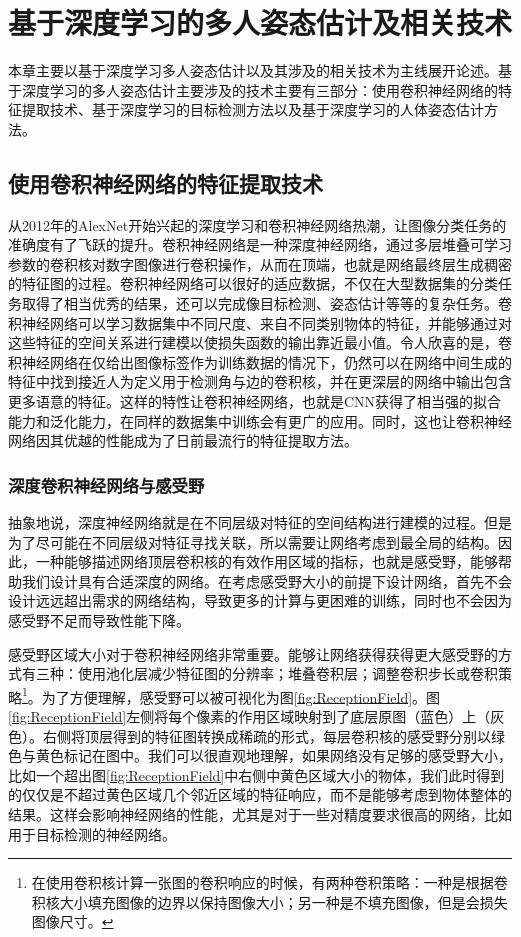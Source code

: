 \chapter{基于深度学习的多人姿态估计及相关技术}
\label{cha:basicfacts}
本章主要以基于深度学习多人姿态估计以及其涉及的相关技术为主线展开论述。基于深度学习的多人姿态估计主要涉及的技术主要有三部分：使用卷积神经网络的特征提取技术、基于深度学习的目标检测方法以及基于深度学习的人体姿态估计方法。
\section{使用卷积神经网络的特征提取技术}
\label{sec:factsfeature}
从2012年的AlexNet\cite{alex2012alexnet}开始兴起的深度学习和卷积神经网络热潮，让图像分类任务的准确度有了飞跃的提升。卷积神经网络是一种深度神经网络，通过多层堆叠可学习参数的卷积核对数字图像进行卷积操作，从而在顶端，也就是网络最终层生成稠密的特征图的过程。卷积神经网络可以很好的适应数据，不仅在大型数据集的分类任务取得了相当优秀的结果，还可以完成像目标检测、姿态估计等等的复杂任务。卷积神经网络可以学习数据集中不同尺度、来自不同类别物体的特征，并能够通过对这些特征的空间关系进行建模以使损失函数的输出靠近最小值。令人欣喜的是，卷积神经网络在仅给出图像标签作为训练数据的情况下，仍然可以在网络中间生成的特征中找到接近人为定义用于检测角与边的卷积核，并在更深层的网络中输出包含更多语意的特征\cite{yosinski2015understanding}。这样的特性让卷积神经网络，也就是CNN获得了相当强的拟合能力和泛化能力，在同样的数据集中训练会有更广的应用。同时，这也让卷积神经网络因其优越的性能成为了日前最流行的特征提取方法。
\subsection{深度卷积神经网络与感受野}
\label{subsec:factsreceptionfield}
抽象地说，深度神经网络就是在不同层级对特征的空间结构进行建模的过程。但是为了尽可能在不同层级对特征寻找关联，所以需要让网络考虑到最全局的结构。因此，一种能够描述网络顶层卷积核的有效作用区域的指标，也就是感受野，能够帮助我们设计具有合适深度的网络。在考虑感受野大小的前提下设计网络，首先不会设计远远超出需求的网络结构，导致更多的计算与更困难的训练，同时也不会因为感受野不足而导致性能下降。

感受野区域大小对于卷积神经网络非常重要。能够让网络获得获得更大感受野的方式有三种：使用池化层减少特征图的分辨率；堆叠卷积层；调整卷积步长或卷积策略\footnote{在使用卷积核计算一张图的卷积响应的时候，有两种卷积策略：一种是根据卷积核大小填充图像的边界以保持图像大小；另一种是不填充图像，但是会损失图像尺寸。}。为了方便理解，感受野可以被可视化为图\ref{fig:ReceptionField}。图\ref{fig:ReceptionField}左侧将每个像素的作用区域映射到了底层原图（蓝色）上（灰色）。右侧将顶层得到的特征图转换成稀疏的形式，每层卷积核的感受野分别以绿色与黄色标记在图中。我们可以很直观地理解，如果网络没有足够的感受野大小，比如一个超出图\ref{fig:ReceptionField}中右侧中黄色区域大小的物体，我们此时得到的仅仅是不超过黄色区域几个邻近区域的特征响应，而不是能够考虑到物体整体的结果。这样会影响神经网络的性能，尤其是对于一些对精度要求很高的网络，比如用于目标检测的神经网络。

